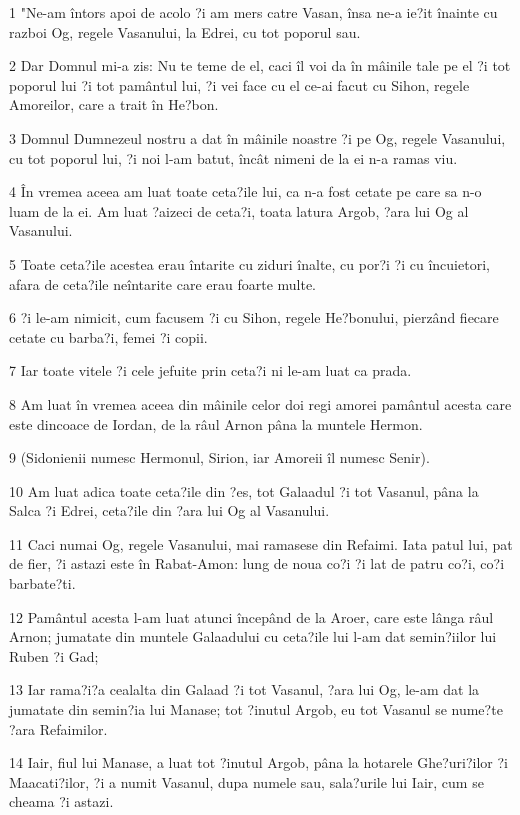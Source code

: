 \par 1 "Ne-am întors apoi de acolo ?i am mers catre Vasan, însa ne-a ie?it înainte cu razboi Og, regele Vasanului, la Edrei, cu tot poporul sau.
\par 2 Dar Domnul mi-a zis: Nu te teme de el, caci îl voi da în mâinile tale pe el ?i tot poporul lui ?i tot pamântul lui, ?i vei face cu el ce-ai facut cu Sihon, regele Amoreilor, care a trait în He?bon.
\par 3 Domnul Dumnezeul nostru a dat în mâinile noastre ?i pe Og, regele Vasanului, cu tot poporul lui, ?i noi l-am batut, încât nimeni de la ei n-a ramas viu.
\par 4 În vremea aceea am luat toate ceta?ile lui, ca n-a fost cetate pe care sa n-o luam de la ei. Am luat ?aizeci de ceta?i, toata latura Argob, ?ara lui Og al Vasanului.
\par 5 Toate ceta?ile acestea erau întarite cu ziduri înalte, cu por?i ?i cu încuietori, afara de ceta?ile neîntarite care erau foarte multe.
\par 6 ?i le-am nimicit, cum facusem ?i cu Sihon, regele He?bonului, pierzând fiecare cetate cu barba?i, femei ?i copii.
\par 7 Iar toate vitele ?i cele jefuite prin ceta?i ni le-am luat ca prada.
\par 8 Am luat în vremea aceea din mâinile celor doi regi amorei pamântul acesta care este dincoace de Iordan, de la râul Arnon pâna la muntele Hermon.
\par 9 (Sidonienii numesc Hermonul, Sirion, iar Amoreii îl numesc Senir).
\par 10 Am luat adica toate ceta?ile din ?es, tot Galaadul ?i tot Vasanul, pâna la Salca ?i Edrei, ceta?ile din ?ara lui Og al Vasanului.
\par 11 Caci numai Og, regele Vasanului, mai ramasese din Refaimi. Iata patul lui, pat de fier, ?i astazi este în Rabat-Amon: lung de noua co?i ?i lat de patru co?i, co?i barbate?ti.
\par 12 Pamântul acesta l-am luat atunci începând de la Aroer, care este lânga râul Arnon; jumatate din muntele Galaadului cu ceta?ile lui l-am dat semin?iilor lui Ruben ?i Gad;
\par 13 Iar rama?i?a cealalta din Galaad ?i tot Vasanul, ?ara lui Og, le-am dat la jumatate din semin?ia lui Manase; tot ?inutul Argob, eu tot Vasanul se nume?te ?ara Refaimilor.
\par 14 Iair, fiul lui Manase, a luat tot ?inutul Argob, pâna la hotarele Ghe?uri?ilor ?i Maacati?ilor, ?i a numit Vasanul, dupa numele sau, sala?urile lui Iair, cum se cheama ?i astazi.
